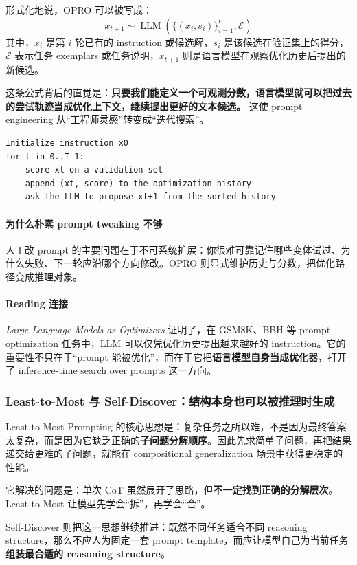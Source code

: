 形式化地说，OPRO 可以被写成：
\[
x_{t+1} \sim \operatorname{LLM}\left(\{(x_i, s_i)\}_{i=1}^{t}, \mathcal{E}\right)
\]
其中，$x_i$ 是第 $i$ 轮已有的 instruction 或候选解，$s_i$ 是该候选在验证集上的得分，$\mathcal{E}$ 表示任务 exemplars 或任务说明，$x_{t+1}$ 则是语言模型在观察优化历史后提出的新候选。

这条公式背后的直觉是：\textbf{只要我们能定义一个可观测分数，语言模型就可以把过去的尝试轨迹当成优化上下文，继续提出更好的文本候选。} 这使 prompt engineering 从“工程师灵感”转变成“迭代搜索”。

\begin{lstlisting}
Initialize instruction x0
for t in 0..T-1:
    score xt on a validation set
    append (xt, score) to the optimization history
    ask the LLM to propose xt+1 from the sorted history
\end{lstlisting}

\paragraph{为什么朴素 prompt tweaking 不够}
人工改 prompt 的主要问题在于不可系统扩展：你很难可靠记住哪些变体试过、为什么失败、下一轮应沿哪个方向修改。OPRO 则显式维护历史与分数，把优化路径变成推理对象。

\paragraph{Reading 连接}
\emph{Large Language Models as Optimizers} 证明了，在 GSM8K、BBH 等 prompt optimization 任务中，LLM 可以仅凭优化历史提出越来越好的 instruction。它的重要性不只在于“prompt 能被优化”，而在于它把\textbf{语言模型自身当成优化器}，打开了 inference-time search over prompts 这一方向。

\subsubsection{Least-to-Most 与 Self-Discover：结构本身也可以被推理时生成}

Least-to-Most Prompting 的核心思想是：复杂任务之所以难，不是因为最终答案太复杂，而是因为它缺乏正确的\textbf{子问题分解顺序}。因此先求简单子问题，再把结果递交给更难的子问题，就能在 compositional generalization 场景中获得更稳定的性能。

它解决的问题是：单次 CoT 虽然展开了思路，但\textbf{不一定找到正确的分解层次}。Least-to-Most 让模型先学会“拆”，再学会“合”。

Self-Discover 则把这一思想继续推进：既然不同任务适合不同 reasoning structure，那么不应人为固定一套 prompt template，而应让模型自己为当前任务\textbf{组装最合适的 reasoning structure}。

